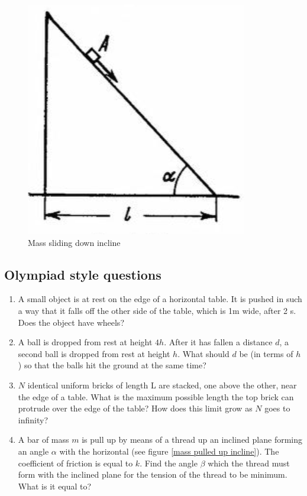 \documentclass{article}
\begin{document}
\begin{figure}
    \centering
    \includegraphics[width=0.5\linewidth]{assets/masses sliding down incline.png}
    \caption{Mass sliding down incline}
    \label{mass sliding down incline}
\end{figure}

\subsection{Olympiad style questions}
\begin{enumerate}
\item A small object is at rest on the edge of a horizontal table. It is pushed in such a way that it falls off the other side of the table, which is 1m wide, after 2 s. Does the object have wheels?

\item A ball is dropped from rest at height $4h$. After it has fallen a distance $d$, a second ball is
dropped from rest at height $h$. What should $d$ be (in terms of $h$) so that the balls hit the
ground at the same time?

\item $N$ identical uniform bricks of length L are stacked, one above the other, near the edge
of a table. What is the maximum possible length the top brick can protrude over the edge of the
table? How does this limit grow as $N$ goes to infinity?

\item A bar of mass $m$ is pull up by means of a thread up an inclined plane forming an angle $\alpha$ with the horizontal (see figure \ref{mass pulled up incline}). The coefficient of friction is equal to $k$. Find the angle $\beta$ which the thread must form with the inclined plane for the tension of the thread to be minimum. What is it equal to?
\end{enumerate}
\end{document}
